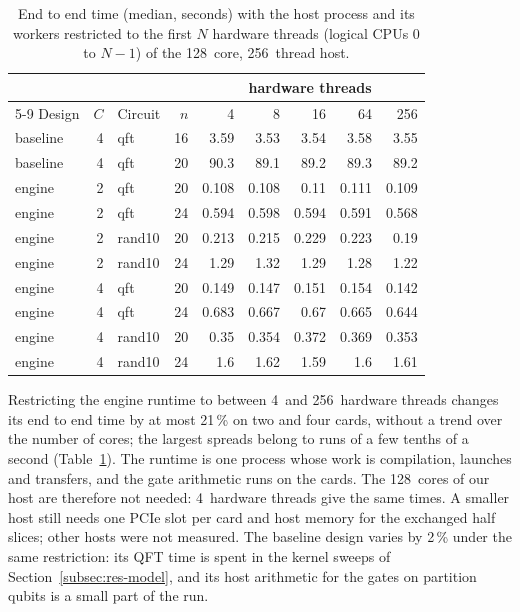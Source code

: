 \documentclass[pdflatex,sn-mathphys-num]{sn-jnl}
\newcommand{\NumHostCores}{128}
\newcommand{\NumHostCoresMax}{256}
\newcommand{\NumHostCoresMin}{4}
\newcommand{\NumHostSpreadBaselinePct}{2}
\newcommand{\NumHostSpreadEnginePct}{21}
\newcommand{\NumHostThreads}{256}
\theoremstyle{thmstyleone}
\theoremstyle{thmstylethree}
\begin{document}
\begin{table}[t]
\caption{End to end time (median, seconds) with the host process and its workers restricted to the first $N$ hardware
threads (logical CPUs $0$ to $N-1$) of the \NumHostCores~core, \NumHostThreads~thread host.}\label{tab:host}
\begin{tabular}{@{}lrlrrrrrr@{}}
\toprule
 & & & & \multicolumn{5}{c}{hardware threads} \\
\cmidrule(l){5-9}
Design & $C$ & Circuit & $n$ & 4 & 8 & 16 & 64 & 256 \\
\midrule
baseline & 4 & qft & 16 & 3.59 & 3.53 & 3.54 & 3.58 & 3.55 \\
baseline & 4 & qft & 20 & 90.3 & 89.1 & 89.2 & 89.3 & 89.2 \\
engine & 2 & qft & 20 & 0.108 & 0.108 & 0.11 & 0.111 & 0.109 \\
engine & 2 & qft & 24 & 0.594 & 0.598 & 0.594 & 0.591 & 0.568 \\
engine & 2 & rand10 & 20 & 0.213 & 0.215 & 0.229 & 0.223 & 0.19 \\
engine & 2 & rand10 & 24 & 1.29 & 1.32 & 1.29 & 1.28 & 1.22 \\
engine & 4 & qft & 20 & 0.149 & 0.147 & 0.151 & 0.154 & 0.142 \\
engine & 4 & qft & 24 & 0.683 & 0.667 & 0.67 & 0.665 & 0.644 \\
engine & 4 & rand10 & 20 & 0.35 & 0.354 & 0.372 & 0.369 & 0.353 \\
engine & 4 & rand10 & 24 & 1.6 & 1.62 & 1.59 & 1.6 & 1.61 \\
\bottomrule
\end{tabular}
\end{table}

Restricting the engine runtime to between \NumHostCoresMin~and \NumHostCoresMax~hardware threads changes its end to
end time by at most \NumHostSpreadEnginePct\,\% on two and four cards, without a trend over the number of cores; the
largest spreads belong to runs of a few tenths of a second (Table~\ref{tab:host}). The runtime is one process whose
work is compilation, launches and transfers, and the gate arithmetic runs on the cards. The \NumHostCores~cores of our
host are therefore not needed: \NumHostCoresMin~hardware threads give the same times. A smaller host still needs one PCIe slot per
card and host memory for the exchanged half slices; other hosts were not measured.
The baseline design varies by \NumHostSpreadBaselinePct\,\% under the same restriction: its QFT time is spent
in the kernel sweeps of Section~\ref{subsec:res-model}, and its host arithmetic for the gates on partition qubits is a
small part of the run.
\end{document}

